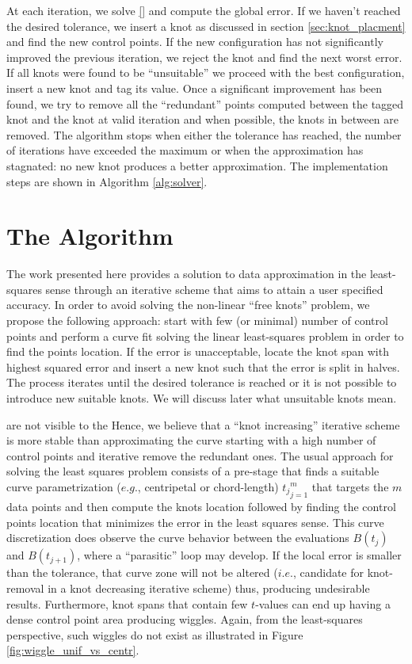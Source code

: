 At each iteration, we solve \eqref{} and compute the global error. If we haven't reached the desired tolerance, 
we insert a knot as discussed in section \ref{sec:knot_placment} and find the new control points. If the 
new configuration has not significantly improved the previous iteration, we reject the knot and find the next worst error. 
 If all knots were found to be ``unsuitable'' we proceed with the best configuration, insert a new knot and tag its 
 value. Once a significant improvement has been found, we try to remove all the ``redundant'' points computed between the tagged knot and the 
 knot at valid iteration and when possible, the knots in between are removed. The algorithm stops when either the tolerance has reached, 
 the number of iterations have exceeded the maximum or when the approximation has stagnated: no new knot 
 produces a better approximation. The implementation steps are shown in Algorithm \ref{alg:solver}. 

 
 
 \section{The Algorithm}
 
 The work presented here provides a solution to data approximation in the least-squares sense through an iterative 
 scheme that aims to attain a user specified accuracy. 
In order to avoid solving the non-linear ``free knots'' problem, we propose the following approach: start with few (or minimal) number of control points and perform a curve fit solving the linear least-squares problem in order to find 
the points location. If the error is unacceptable, locate the knot span with highest squared error and insert a  new knot such that the error is split in halves. The process iterates until the desired tolerance is reached or it is not 
possible to introduce new suitable knots. We will discuss later what unsuitable knots mean. 


 
 
 are not visible to the 
Hence, we believe that 
a ``knot increasing'' iterative scheme is more stable than approximating the curve starting with a high number of control points and iterative remove the redundant ones. 
The usual approach for solving the least squares problem consists of a pre-stage that finds a suitable curve parametrization ($e.g.$, centripetal or chord-length)  ${t_j}_{j=1}^m$ that targets the $m$ data points and
then compute the knots location followed by finding the control points location that minimizes the error in the least squares sense. 
This curve discretization does observe the curve behavior between the evaluations $B(t_j)$ and $B(t_{j+1})$, where a ``parasitic'' loop may develop. If the local error is smaller than the tolerance, that 
curve zone will not be altered ($i.e.$, candidate for knot-removal in a knot decreasing iterative scheme) thus, producing undesirable results. Furthermore, knot spans that contain few $t$-values can end up having a dense control point area 
producing wiggles. Again, from the least-squares perspective, such wiggles do not exist as illustrated in Figure \ref{fig:wiggle_unif_vs_centr}.



